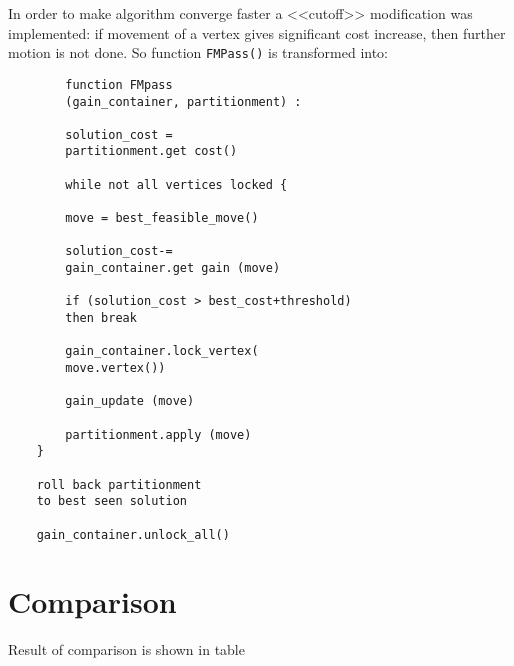 \documentclass[12pt,a4paper,twocolumn]{article}
\begin{document}
	In order to make algorithm converge faster a <<cutoff>> modification was implemented: if movement of a vertex gives significant cost increase, then further motion is not done. So function \texttt{FMPass()} is transformed into:
	\begin{verbatim}
		function FMpass
		(gain_container, partitionment) :
		
		solution_cost = 
		partitionment.get cost()
		
		while not all vertices locked {
		
		move = best_feasible_move()
		
		solution_cost-= 
		gain_container.get gain (move)
		
		if (solution_cost > best_cost+threshold)
		then break
		
		gain_container.lock_vertex(
		move.vertex())
		
		gain_update (move)
		
		partitionment.apply (move)
	}
	
	roll back partitionment 
	to best seen solution
	
	gain_container.unlock_all()

	\end{verbatim}
	
	\section{Comparison}
	
	Result of comparison is shown in table 
	
\end{document}
